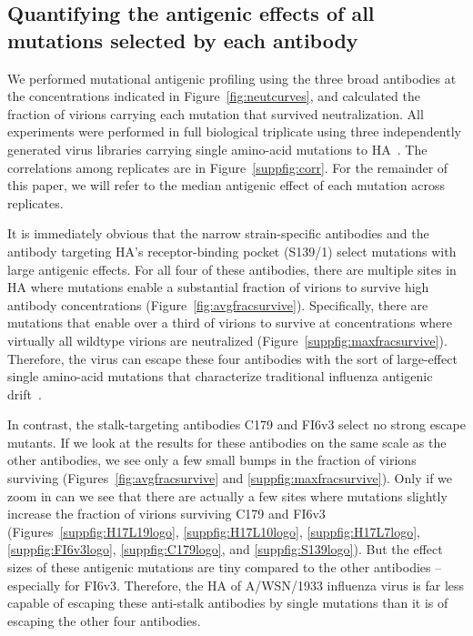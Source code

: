 \documentclass[11pt]{article}
\begin{document}
\subsection*{Quantifying the antigenic effects of all mutations selected by each antibody}
We performed mutational antigenic profiling using the three broad antibodies at the concentrations indicated in Figure~\ref{fig:neutcurves}, and calculated the fraction of virions carrying each mutation that survived neutralization. 
All experiments were performed in full biological triplicate using three independently generated virus libraries carrying single amino-acid mutations to HA~\citep{doud2016accurate}.
The correlations among replicates are in Figure~\ref{suppfig:corr}.
For the remainder of this paper, we will refer to the median antigenic effect of each mutation across replicates.

It is immediately obvious that the narrow strain-specific antibodies and the antibody targeting HA's receptor-binding pocket (S139/1) select mutations with large antigenic effects.
For all four of these antibodies, there are multiple sites in HA where mutations enable a substantial fraction of virions to survive high antibody concentrations (Figure~\ref{fig:avgfracsurvive}).
Specifically, there are mutations that enable over a third of virions to survive at concentrations where virtually all wildtype virions are neutralized (Figure~\ref{suppfig:maxfracsurvive}).
Therefore, the virus can escape these four antibodies with the sort of large-effect single amino-acid mutations that characterize traditional influenza antigenic drift~\citep{yewdell1979antigenic,webster1980determination,koel2013substitutions,chambers2015identification,petrie2016antibodies,neher2016prediction}.  

In contrast, the stalk-targeting antibodies C179 and FI6v3 select no strong escape mutants. 
If we look at the results for these antibodies on the same scale as the other antibodies, we see only a few small bumps in the fraction of virions surviving (Figures~\ref{fig:avgfracsurvive} and \ref{suppfig:maxfracsurvive}).
Only if we zoom in can we see that there are actually a few sites where mutations slightly increase the fraction of virions surviving C179 and FI6v3 (Figures~\ref{suppfig:H17L19logo}, \ref{suppfig:H17L10logo}, \ref{suppfig:H17L7logo}, \ref{suppfig:FI6v3logo}, \ref{suppfig:C179logo}, and \ref{suppfig:S139logo}).
But the effect sizes of these antigenic mutations are tiny compared to the other antibodies -- especially for FI6v3.
Therefore, the HA of A/WSN/1933 influenza virus is far less capable of escaping these anti-stalk antibodies by single mutations than it is of escaping the other four antibodies. 
\end{document}
